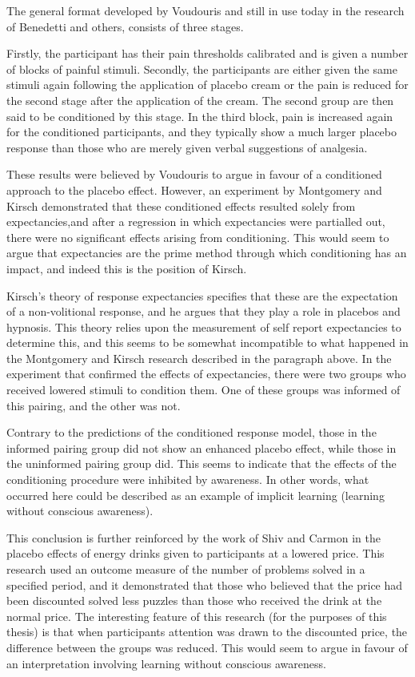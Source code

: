 The general format developed by Voudouris and still in use today in the research of Benedetti \cite{Benedetti2006c} and others, consists of three stages. 

Firstly, the participant has their pain thresholds calibrated and is given a number of blocks of painful stimuli. Secondly, the participants are either given the same stimuli again following the application of placebo cream or the pain is reduced for the second stage after the application of the cream. The second group are then said to be conditioned by this stage. In the third block, pain is increased again for the conditioned participants, and they typically show a much larger placebo response than those who are merely given verbal suggestions of analgesia.  

These results were believed by Voudouris to argue in favour of a conditioned approach to the placebo effect. However, an experiment by Montgomery and Kirsch \cite{Montgomery1997} demonstrated that these conditioned effects resulted solely from expectancies,and after a regression in which expectancies were partialled out, there were no significant effects arising from conditioning. This would seem to argue that expectancies are the prime method through which conditioning has an impact, and indeed this is the position of Kirsch. 

Kirsch's \cite{Kirsch1985,Kirsch1997} theory of response expectancies specifies that these are the expectation of a non-volitional response, and he argues that they play a role in placebos and hypnosis. This theory  relies upon the measurement of self report expectancies to determine this, and this seems  to be somewhat incompatible to what happened in the Montgomery and Kirsch research described in the paragraph above. In the experiment that confirmed the effects of expectancies, there were two groups who received lowered stimuli to condition them. One of these groups was informed of this pairing, and the other was not. 

Contrary to the predictions of the conditioned response model, those in the informed pairing group did not show an enhanced placebo effect, while those in the uninformed pairing group did. This seems to indicate that the effects of the conditioning procedure were inhibited by awareness. In other words, what occurred here could be described as an example of implicit learning (learning without conscious awareness).

This conclusion is further reinforced by the work of Shiv and Carmon \cite{Shiv2005a} in the placebo effects of energy drinks given to participants at a lowered price. This research used an outcome measure of the number of problems solved in a specified period, and it demonstrated that those who believed that the price had been discounted solved less puzzles than those who received the drink at the normal price. The interesting feature of this research (for the purposes of this thesis) is that when participants attention was drawn to the discounted price, the difference between the groups was reduced. This would seem to argue in favour of an interpretation involving learning without conscious awareness. 

